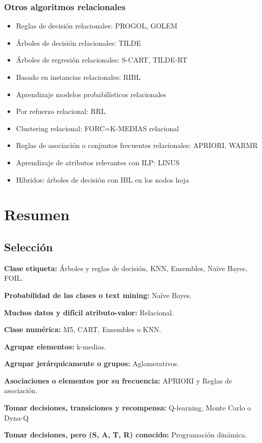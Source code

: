 \documentclass[12pt, twoside, openright]{report} %
\begin{document}
\subsection{Otros algoritmos relacionales}
\begin{itemize}
	\item Reglas de decisión relacionales: PROGOL, GOLEM
	\item Árboles de decisión relacionales: TILDE
	\item Árboles de regresión relacionales: S-CART, TILDE-RT
	\item Basado en instancias relacionales: RIBL
	\item Aprendizaje modelos probabilísticos relacionales
	\item Por refuerzo relacional: RRL
	\item Clustering relacional: FORC=K-MEDIAS relacional
	\item Reglas de asociación o conjuntos frecuentes relacionales: APRIORI, WARMR
	\item Aprendizaje de atributos relevantes con ILP: LINUS
	\item Híbridos: árboles de decisión con IBL en los nodos hoja
\end{itemize}

\chapter{Resumen}
\section{Selección}
\textbf{Clase etiqueta:} Árboles y reglas de decisión, KNN, Ensembles, Naïve Bayes, FOIL.

\textbf{Probabilidad de las clases o text mining:} Naïve Bayes.

\textbf{Muchos datos y difícil atributo-valor:} Relacional.

\textbf{Clase numérica:} M5, CART, Ensembles o KNN.

\textbf{Agrupar elementos:} k-medias.

\textbf{Agrupar jerárquicamente o grupos:} Aglomerativos.

\textbf{Asociaciones o elementos por su frecuencia:} APRIORI y Reglas de asociación.

\textbf{Tomar decisiones, transiciones y recompensa:} Q-learning, Monte Carlo o Dyna-Q

\textbf{Tomar decisiones, pero (S, A, T, R) conocido:} Programación dinámica.
\end{document}
